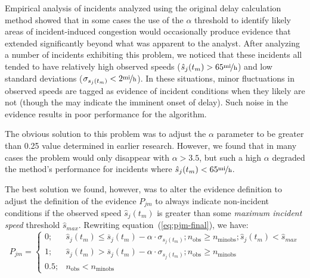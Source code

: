 \documentclass[12pt]{report}
\renewcommand{\fixme}[3][]{#1\xspace}
\newcounter{space}
\begin{document}
Empirical analysis of incidents analyzed using the original delay calculation
method showed that in some cases the use of the $\alpha$ threshold to identify
likely areas of incident-induced congestion would occasionally produce evidence
that extended significantly beyond what was apparent to the analyst.  
After analyzing a number of incidents exhibiting this problem, we noticed that
these incidents all tended to have relatively high observed speeds
($\hat{s}_j(t_m)>65\unitfrac{mi}{h}$) and low standard deviations
($\sigma_{s_j(t_m)}<2\unitfrac{mi}{h}$).  In these situations, minor
fluctuations in observed speeds are tagged as evidence of incident conditions
when they likely are not (though the may indicate the imminent onset of delay).
Such noise in the evidence results in poor performance for the algorithm.

The obvious solution to this problem was to adjust the $\alpha$ parameter to be
greater than 0.25 value determined in earlier research.  However, we found that
in many cases the problem would only disappear with $\alpha>3.5$, but such a
high $\alpha$ degraded the method's performance for incidents where
$\hat{s}_j(t_m)<65\unitfrac{mi}{h}$.

The best solution we found, however, was to alter the evidence
definition to adjust the definition of the evidence $P_{jm}$ to always
indicate non-incident conditions if the observed speed
$\hat{s}_j(t_m)$ is greater than some \emph{maximum incident speed}
threshold $\hat{s}_{max}$.  Rewriting equation~(\ref{eq:pjm-final}),
we have:
\begin{equation}
  \label{eq:pjm-final-2}
  P_{jm} = 
  \begin{cases}
    0;& \hat{s}_j(t_m) \le \overline{s}_j(t_m) - \alpha\cdot\sigma_{s_j(t_m)}; n_{\mathrm{obs}} \ge n_{\textrm{minobs}};\hat{s}_j(t_m) < \hat{s}_{max} \\
    1;& \hat{s}_j(t_m) > \overline{s}_j(t_m) - \alpha\cdot\sigma_{s_j(t_m)}; n_{\mathrm{obs}} \ge n_{\textrm{minobs}}\\
    0.5;& n_{\mathrm{obs}} < n_{\textrm{minobs}}
  \end{cases}
\end{equation}
\end{document}
